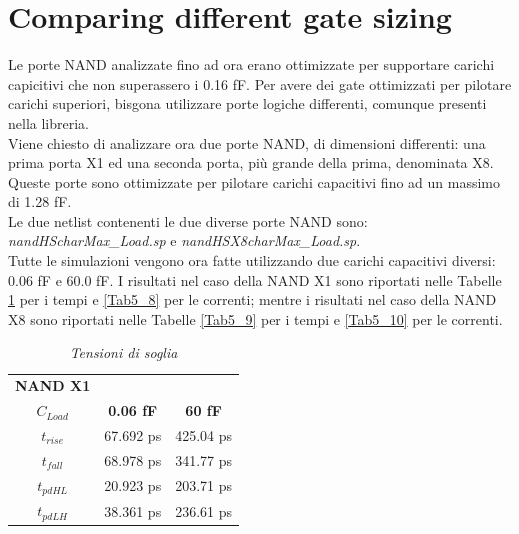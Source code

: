 \section{Comparing different gate sizing}
Le porte NAND analizzate fino ad ora erano ottimizzate per supportare carichi capicitivi che non superassero i 0.16 fF. Per avere dei gate ottimizzati per pilotare carichi superiori, bisgona utilizzare porte logiche differenti, comunque presenti nella libreria. \\
Viene chiesto di analizzare ora due porte NAND, di dimensioni differenti: una prima porta X1 ed una seconda porta, più grande della prima, denominata X8. Queste porte sono ottimizzate per pilotare carichi capacitivi fino ad un massimo di 1.28 fF. \\
Le due netlist contenenti le due diverse porte NAND sono: \textit{nandHScharMax\_Load.sp} e \textit{nandHSX8charMax\_Load.sp}. \\
Tutte le simulazioni vengono ora fatte utilizzando due carichi capacitivi diversi: 0.06 fF e 60.0 fF. I risultati nel caso della NAND X1 sono riportati nelle Tabelle \ref{Tab5_7} per i tempi e \ref{Tab5_8} per le correnti; mentre i risultati nel caso della NAND X8 sono riportati nelle Tabelle \ref{Tab5_9} per i tempi e \ref{Tab5_10} per le correnti.
\begin{table}[!h]\footnotesize
	\centering
	\begin{tabular}{|c|c|c|}
		\hline
		\textbf{NAND X1} & &\\
		\textbf{$C_{Load}$} & \textbf{0.06 fF} & \textbf{60 fF}\\
		\hline
		$t_{rise}$ &67.692 ps &425.04 ps  \\
		
		$t_{fall}$ &68.978 ps &341.77 ps  \\
		
		$t_{pdHL}$&20.923 ps &203.71 ps  \\
		
		$t_{pdLH}$ &38.361 ps&236.61 ps  \\
		
		\hline
	\end{tabular}
	\caption{\textit{Tensioni di soglia}}
	\label{Tab5_7}
\end{table}
